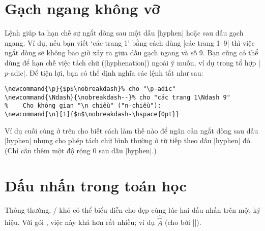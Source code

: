 \documentclass[11pt,leqno,titlepage,openany]{amsldoc}[1999/12/13]
\begin{document}
\section{Gạch ngang không vỡ}

Lệnh  giúp ta hạn chế sự ngắt dòng sau một dấu |hyphen|
hoặc sau dấu gạch ngang.
Ví dụ, nếu bạn viết `các trang 1' bằng cách dùng |các trang 1\nobreakdash--9|
thì việc ngắt dòng sẽ không bao giờ xảy ra giữa dấu gạch ngang và số 9.
Bạn cũng có thể dùng  để hạn chế việc tách chữ (|hyphenation|)
ngoài ý muốn, ví dụ trong tổ hợp |$p$-adic|. Để tiện lợi, bạn có thể định
nghĩa các lệnh tắt như sau:

\medskip
\begin{verbatim}
\newcommand{\p}{$p$\nobreakdash}% cho "\p-adic"
\newcommand{\Ndash}{\nobreakdash--}% cho "các trang 1\Ndash 9"
%    Cho không gian "\n chiều" ("n-chiều"):
\newcommand{\n}[1]{$n$\nobreakdash-\hspace{0pt}}
\end{verbatim}

\medskip
Ví dụ cuối cùng ở trên cho biết cách làm thế nào để ngăn cản ngắt dòng sau dấu
|hyphen| nhưng cho phép tách chữ bình thường ở từ tiếp theo dấu |hyphen| đó.
(Chỉ cần thêm một độ rộng 0 sau dấu |hyphen|.)

\section{Dấu nhấn trong toán học}

Thông thường, \latex/ khó có thể biểu diễn cho đẹp cùng lúc hai dấu nhấn
trên một ký hiệu. Với gói , việc này khá hơn rất nhiều; ví dụ
$\hat{\hat{A}}$ (cho bởi |{}|).
\end{document}
